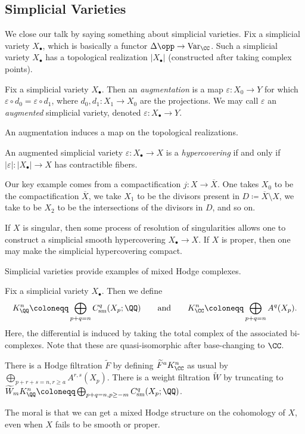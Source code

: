 \documentclass{article}
\begin{document}
\subsection{Simplicial Varieties}
We close our talk by saying something about simplicial varieties. Fix a simplicial variety $X_\bullet$, which is basically a functor $\Delta\opp\to\mathrm{Var}_\CC$. Such a simplicial variety $X_\bullet$ has a topological realization $\left|X_\bullet\right|$ (constructed after taking complex points).
\begin{definition}
	Fix a simplicial variety $X_\bullet$. Then an \textit{augmentation} is a map $\varepsilon\colon X_0\to Y$ for which $\varepsilon\circ d_0=\varepsilon\circ d_1$, where $d_0,d_1\colon X_1\to X_0$ are the projections. We may call $\varepsilon$ an \textit{augmented} simplicial variety, denoted $\varepsilon\colon X_\bullet\to Y$.
\end{definition}
\begin{remark}
	An augmentation induces a map on the topological realizations.
\end{remark}
\begin{definition}[hypercover]
	An augmented simplicial variety $\varepsilon\colon X_\bullet\to X$ is a \textit{hypercovering} if and only if $\left|\varepsilon\right|\colon\left|X_\bullet\right|\to X$ has contractible fibers.
\end{definition}
\begin{example}
	Our key example comes from a compactification $j\colon X\to\overline X$. One takes $X_0$ to be the compactification $\overline X$, we take $X_1$ to be the divisors present in $D\coloneqq\overline X\setminus X$, we take to be $X_2$ to be the intersections of the divisors in $D$, and so on.
\end{example}
\begin{remark}
	If $X$ is singular, then some process of resolution of singularities allows one to construct a simplicial smooth hypercovering $X_\bullet\to X$. If $X$ is proper, then one may make the simplicial hypercovering compact.
\end{remark}
Simplicial varieties provide examples of mixed Hodge complexes.
\begin{notation}
	Fix a simplicial variety $X_\bullet$. Then we define
	\[K^n_\QQ\coloneqq\bigoplus_{p+q=n}C^q_{\mathrm{sm}}(X_p;\QQ)\qquad\text{and}\qquad K^n_\CC\coloneqq\bigoplus_{p+q=n}A^q(X_p).\]
	Here, the differential is induced by taking the total complex of the associated bi-complexes. Note that these are quasi-isomorphic after base-changing to $\CC$.
\end{notation}
\begin{remark}
	There is a Hodge filtration $\widetilde F$ by defining $\widetilde F^aK^n_\CC$ as usual by $\bigoplus_{p+r+s=n,r\ge a}A^{r,s}(X_p)$. There is a weight filtration $\widetilde W$ by truncating to $\widetilde W_mK^n_\QQ\coloneqq\bigoplus_{p+q=n,p\ge-m}C^q_{\mathrm{sm}}(X_p;\QQ)$.
\end{remark}
The moral is that we can get a mixed Hodge structure on the cohomology of $X$, even when $X$ fails to be smooth or proper.
\end{document}
